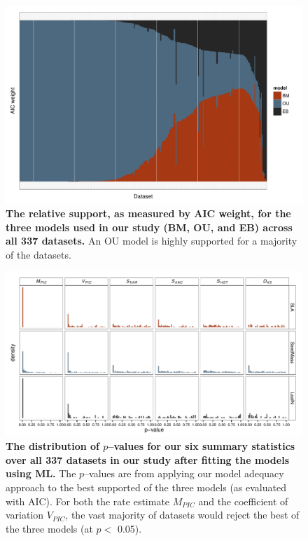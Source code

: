 \documentclass[a4paper,12pt]{article}
\begin{document}
\begin{figure}[p]
  \centering
  \includegraphics[angle=90, origin=c, scale=0.8]{figs/aic-support}
  \caption{\textbf{The relative support, as measured by AIC weight, for the three models used in our study (BM, OU, and EB) across all 337 datasets.} An OU model is highly supported for a majority of the datasets.}
  \label{fig:aic-support}
\end{figure}

\begin{figure}[p]
  \centering
  \includegraphics[angle=90, origin=c, scale=0.85]{figs/pval-hist-ml}
  \caption{\textbf{The distribution of $p$--values for our six summary statistics over all 337 datasets in our study after fitting the models using ML.} The $p$--values are from applying our model adequacy approach to the best supported of the three models (as evaluated with AIC). For both the rate estimate $M_{PIC}$ and the coefficient of variation $V_{PIC}$, the vast majority of datasets would reject the best of the three models (at $p<$ 0.05).}
  \label{fig:pvalues}
\end{figure}
\end{document}
